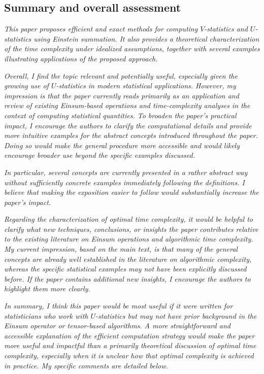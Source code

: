 \documentclass[12pt]{article}
\begin{document}
\subsection*{Summary and overall assessment}

\emph{This paper proposes efficient and exact methods for computing $V$-statistics and $U$-statistics using Einstein summation. It also provides a theoretical characterization of the time complexity under idealized assumptions, together with several examples illustrating applications of the proposed approach.}

\emph{Overall, I find the topic relevant and potentially useful, especially given the growing use of $U$-statistics in modern statistical applications. However, my impression is that the paper currently reads primarily as an application and review of existing Einsum-based operations and time-complexity analyses in the context of computing statistical quantities. To broaden the paper's practical impact, I encourage the authors to clarify the computational details and provide more intuitive examples for the abstract concepts introduced throughout the paper. Doing so would make the general procedure more accessible and would likely encourage broader use beyond the specific examples discussed.}

\emph{In particular, several concepts are currently presented in a rather abstract way without sufficiently concrete examples immediately following the definitions. I believe that making the exposition easier to follow would substantially increase the paper's impact.}

\emph{Regarding the characterization of optimal time complexity, it would be helpful to clarify what new techniques, conclusions, or insights the paper contributes relative to the existing literature on Einsum operations and algorithmic time complexity. My current impression, based on the main text, is that many of the general concepts are already well established in the literature on algorithmic complexity, whereas the specific statistical examples may not have been explicitly discussed before. If the paper contains additional new insights, I encourage the authors to highlight them more clearly.}

\emph{In summary, I think this paper would be most useful if it were written for statisticians who work with $U$-statistics but may not have prior background in the Einsum operator or tensor-based algorithms. A more straightforward and accessible explanation of the efficient computation strategy would make the paper more useful and impactful than a primarily theoretical discussion of optimal time complexity, especially when it is unclear how that optimal complexity is achieved in practice. My specific comments are detailed below.}
\end{document}
